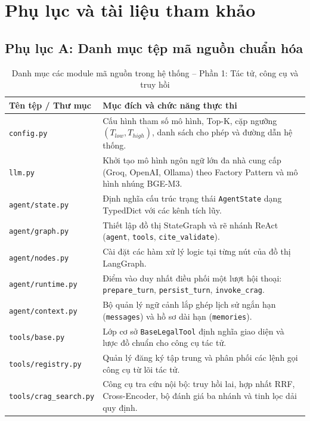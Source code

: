\chapter{Phụ lục và tài liệu tham khảo}

\section{Phụ lục A: Danh mục tệp mã nguồn chuẩn hóa}

\begin{table}[htbp]
\centering
\caption{Danh mục các module mã nguồn trong hệ thống -- Phần 1: Tác tử, công cụ và truy hồi}
\label{tab:source_files_part1}
\renewcommand{\arraystretch}{1.25}
\begin{tabularx}{\textwidth}{L{4.8cm} Y}
\toprule
{}\color{white}\textbf{Tên tệp / Thư mục} & \color{white}\textbf{Mục đích và chức năng thực thi} \\
\midrule
\texttt{config.py} & Cấu hình tham số mô hình, Top-K, cặp ngưỡng $(T_{low}, T_{high})$, danh sách cho phép và đường dẫn hệ thống. \\
\texttt{llm.py} & Khởi tạo mô hình ngôn ngữ lớn đa nhà cung cấp (Groq, OpenAI, Ollama) theo Factory Pattern và mô hình nhúng BGE-M3. \\
\texttt{agent/state.py} & Định nghĩa cấu trúc trạng thái \texttt{AgentState} dạng TypedDict với các kênh tích lũy. \\
\texttt{agent/graph.py} & Thiết lập đồ thị StateGraph và rẽ nhánh ReAct (\texttt{agent}, \texttt{tools}, \texttt{cite\_validate}). \\
\texttt{agent/nodes.py} & Cài đặt các hàm xử lý logic tại từng nút của đồ thị LangGraph. \\
\texttt{agent/runtime.py} & Điểm vào duy nhất điều phối một lượt hội thoại: \texttt{prepare\_turn}, \texttt{persist\_turn}, \texttt{invoke\_crag}. \\
\texttt{agent/context.py} & Bộ quản lý ngữ cảnh lắp ghép lịch sử ngắn hạn (\texttt{messages}) và hồ sơ dài hạn (\texttt{memories}). \\
\texttt{tools/base.py} & Lớp cơ sở \texttt{BaseLegalTool} định nghĩa giao diện và lược đồ chuẩn cho công cụ tác tử. \\
\texttt{tools/registry.py} & Quản lý đăng ký tập trung và phân phối các lệnh gọi công cụ từ lõi tác tử. \\
\texttt{tools/crag\_search.py} & Công cụ tra cứu nội bộ: truy hồi lai, hợp nhất RRF, Cross-Encoder, bộ đánh giá ba nhánh và tinh lọc dải quy định. \\

\end{tabularx}
\end{table}
